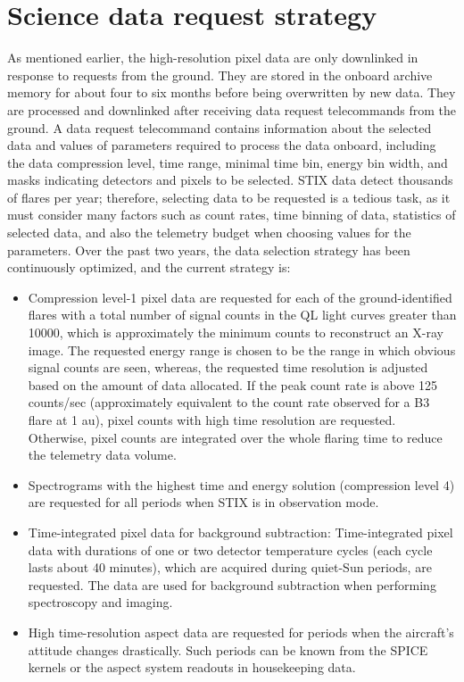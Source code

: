 \documentclass[referee]{aa} %
\begin{document}
\section{Science data request strategy}
As mentioned earlier, the high-resolution pixel data are only downlinked in response to requests from the
ground. They are stored in the onboard archive memory for about four to six months 
before being overwritten by new data. They are processed and downlinked 
after receiving data request telecommands from the ground. 
A data request telecommand contains information about the selected data and values of parameters  required to process the data onboard, including the data compression level, 
time range, minimal time bin, energy bin width, 
and  masks indicating detectors and pixels to be selected. 
STIX data detect thousands of flares per year; therefore, 
selecting data to be requested is a tedious task, as it must consider many factors
such as count rates, time binning of data, statistics of selected data, 
and also the telemetry budget when choosing values for the parameters. 
Over the past two years, the data selection strategy has been continuously optimized, and the current strategy is: 
\begin{itemize}
  \item  
 Compression level-1 pixel data are requested for each of the ground-identified  flares with a total number of signal counts in the QL light curves greater than 10000, which is approximately the minimum counts to reconstruct an X-ray image. 
The requested energy range is chosen to be the range in which obvious signal counts are seen,  
whereas, the requested time resolution is adjusted based on the amount of data allocated. 
If the peak count rate is above 125 counts/sec (approximately 
equivalent to the count rate observed for a B3 flare at 1 au),  pixel counts with high time resolution are requested.  Otherwise, pixel counts are integrated over the whole flaring time 
to reduce the telemetry data volume. 
 \item  Spectrograms with the highest time and energy solution (compression level 4) are requested for all periods when STIX is in observation mode. 
 \item Time-integrated pixel data for background subtraction:
Time-integrated pixel data with durations of one or two detector temperature cycles (each cycle lasts about 40 minutes), which are acquired during quiet-Sun periods, are requested. 
The data are used for background subtraction when performing spectroscopy and imaging. 
\item High time-resolution aspect data are requested for periods when the aircraft's attitude changes drastically.
Such periods can be known from the SPICE kernels or the aspect system readouts in housekeeping data. 
\end{itemize}
\end{document}
